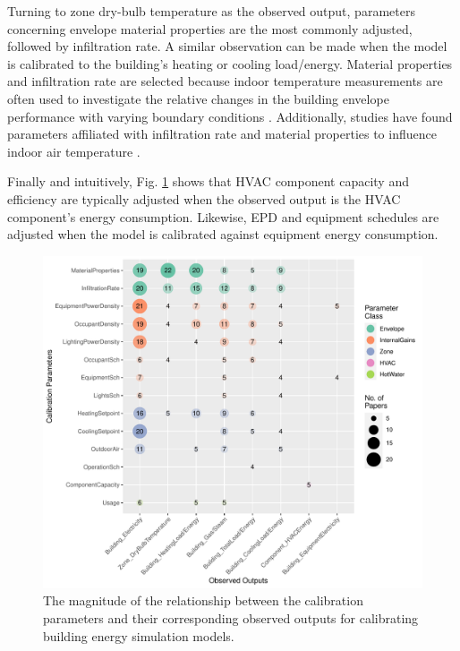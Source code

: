 \documentclass[review]{elsarticle}
\begin{document}
Turning to zone dry-bulb temperature as the observed output, parameters concerning envelope material properties are the most commonly adjusted, followed by infiltration rate. A similar observation can be made when the model is calibrated to the building's heating or cooling load/energy. Material properties and infiltration rate are selected because indoor temperature measurements are often used to investigate the relative changes in the building envelope performance with varying boundary conditions \cite{lee2018improvements, figueiredo2018comparison, cacabelos2017development, enriquez2017towards}. Additionally, studies have found parameters affiliated with infiltration rate and material properties to influence indoor air temperature \cite{martinez2019energy, enriquez2017towards, roberti2015calibrating, cipriano2015evaluation, ferrara2020optimizing}. 

Finally and intuitively, Fig. \ref{fig:target_param} shows that HVAC component capacity and efficiency are typically adjusted when the observed output is the HVAC component's energy consumption. Likewise, EPD and equipment schedules are adjusted when the model is calibrated against equipment energy consumption. 


\begin{figure}[!h]
\centering
\includegraphics[width=\textwidth]{figures/output_parameter.pdf}
\caption{The magnitude of the relationship between the calibration parameters and their corresponding observed outputs for calibrating building energy simulation models.}
\label{fig:target_param}
\end{figure}
\end{document}
